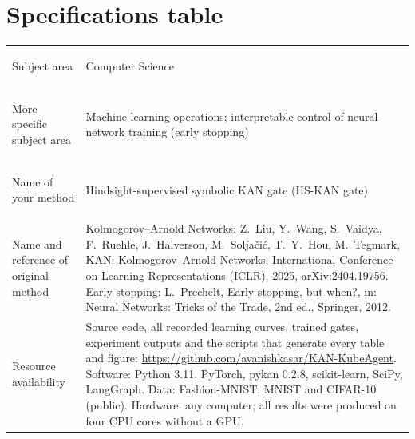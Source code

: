 \section*{Specifications table}
\begin{center}
\small
\renewcommand{\arraystretch}{1.25}
\begin{tabularx}{\textwidth}{>{\bfseries\raggedright\arraybackslash}p{}>{\raggedright\arraybackslash}X}
\toprule
Subject area & Computer Science \\
More specific subject area & Machine learning operations; interpretable control of neural network training (early stopping) \\
Name of your method & Hindsight-supervised symbolic KAN gate (HS-KAN gate) \\
Name and reference of original method & Kolmogorov--Arnold Networks: Z.~Liu, Y.~Wang, S.~Vaidya, F.~Ruehle, J.~Halverson, M.~Solja\v{c}i\'c, T.~Y.~Hou, M.~Tegmark, KAN: Kolmogorov--Arnold Networks, International Conference on Learning Representations (ICLR), 2025, arXiv:2404.19756. Early stopping: L.~Prechelt, Early stopping, but when?, in: Neural Networks: Tricks of the Trade, 2nd ed., Springer, 2012. \\
Resource availability & Source code, all recorded learning curves, trained gates, experiment outputs and the scripts that generate every table and figure: \url{https://github.com/avanishkasar/KAN-KubeAgent}. Software: Python 3.11, PyTorch, pykan 0.2.8, scikit-learn, SciPy, LangGraph. Data: Fashion-MNIST, MNIST and CIFAR-10 (public). Hardware: any computer; all results were produced on four CPU cores without a GPU. \\
\bottomrule
\end{tabularx}
\end{center}
